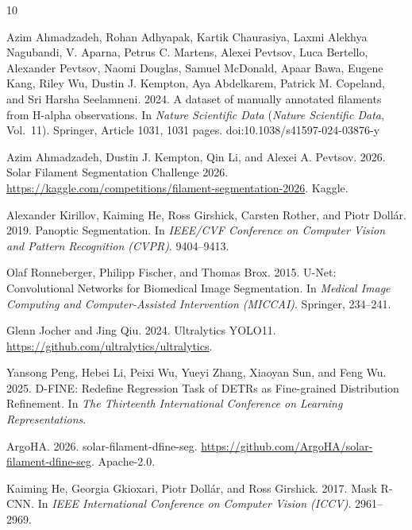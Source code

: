 \documentclass[sigconf,nonacm]{acmart}
\begin{document}
\begin{thebibliography}{10}

Azim Ahmadzadeh, Rohan Adhyapak, Kartik Chaurasiya, Laxmi Alekhya Nagubandi, V. Aparna, Petrus C. Martens, Alexei Pevtsov, Luca Bertello, Alexander Pevtsov, Naomi Douglas, Samuel McDonald, Apaar Bawa, Eugene Kang, Riley Wu, Dustin J. Kempton, Aya Abdelkarem, Patrick M. Copeland, and Sri Harsha Seelamneni. 2024. A dataset of manually annotated filaments from H-alpha observations. In \emph{Nature Scientific Data} (\emph{Nature Scientific Data}, Vol.~11). Springer, Article 1031, 1031 pages. doi:10.1038/s41597-024-03876-y

Azim Ahmadzadeh, Dustin J. Kempton, Qin Li, and Alexei A. Pevtsov. 2026. Solar Filament Segmentation Challenge 2026. \url{https://kaggle.com/competitions/filament-segmentation-2026}. Kaggle.

Alexander Kirillov, Kaiming He, Ross Girshick, Carsten Rother, and Piotr Doll\'ar. 2019. Panoptic Segmentation. In \emph{IEEE/CVF Conference on Computer Vision and Pattern Recognition (CVPR)}. 9404--9413.

Olaf Ronneberger, Philipp Fischer, and Thomas Brox. 2015. U-Net: Convolutional Networks for Biomedical Image Segmentation. In \emph{Medical Image Computing and Computer-Assisted Intervention (MICCAI)}. Springer, 234--241.

Glenn Jocher and Jing Qiu. 2024. Ultralytics YOLO11. \url{https://github.com/ultralytics/ultralytics}.

Yansong Peng, Hebei Li, Peixi Wu, Yueyi Zhang, Xiaoyan Sun, and Feng Wu. 2025. D-FINE: Redefine Regression Task of DETRs as Fine-grained Distribution Refinement. In \emph{The Thirteenth International Conference on Learning Representations}.

ArgoHA. 2026. solar-filament-dfine-seg. \url{https://github.com/ArgoHA/solar-filament-dfine-seg}. Apache-2.0.

Kaiming He, Georgia Gkioxari, Piotr Doll\'ar, and Ross Girshick. 2017. Mask R-CNN. In \emph{IEEE International Conference on Computer Vision (ICCV)}. 2961--2969.

\end{thebibliography}
\end{document}
